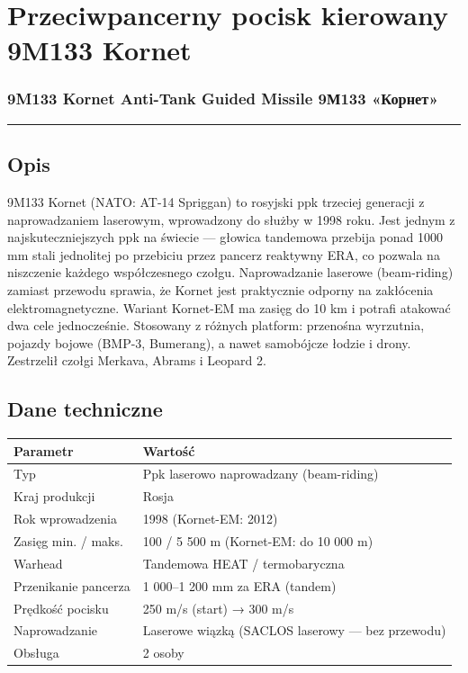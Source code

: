 \documentclass[12pt,oneside]{book}
\begin{document}
\section{Przeciwpancerny pocisk kierowany 9M133
Kornet}\label{przeciwpancerny-pocisk-kierowany-9m133-kornet}

\subsubsection{9M133 Kornet Anti-Tank Guided Missile \textbar{} 9М133
«Корнет»}\label{m133-kornet-anti-tank-guided-missile-9ux43c133-ux43aux43eux440ux43dux435ux442}

\begin{center}\rule{0.5\linewidth}{0.5pt}\end{center}

\subsection{Opis}\label{opis-53}

9M133 Kornet (NATO: AT-14 Spriggan) to rosyjski ppk trzeciej generacji z
naprowadzaniem laserowym, wprowadzony do służby w 1998 roku. Jest jednym
z najskuteczniejszych ppk na świecie --- głowica tandemowa przebija
ponad 1000 mm stali jednolitej po przebiciu przez pancerz reaktywny ERA,
co pozwala na niszczenie każdego współczesnego czołgu. Naprowadzanie
laserowe (beam-riding) zamiast przewodu sprawia, że Kornet jest
praktycznie odporny na zakłócenia elektromagnetyczne. Wariant Kornet-EM
ma zasięg do 10 km i potrafi atakować dwa cele jednocześnie. Stosowany z
różnych platform: przenośna wyrzutnia, pojazdy bojowe (BMP-3, Bumerang),
a nawet samobójcze łodzie i drony. Zestrzelił czołgi Merkava, Abrams i
Leopard 2.

\subsection{Dane techniczne}\label{dane-techniczne-53}

\begin{longtable}[]{@{}ll@{}}
\toprule\noalign{}
Parametr & Wartość \\
\midrule\noalign{}
\endhead
\bottomrule\noalign{}
\endlastfoot
Typ & Ppk laserowo naprowadzany (beam-riding) \\
Kraj produkcji & Rosja \\
Rok wprowadzenia & 1998 (Kornet-EM: 2012) \\
Zasięg min. / maks. & 100 / 5 500 m (Kornet-EM: do 10 000 m) \\
Warhead & Tandemowa HEAT / termobaryczna \\
Przenikanie pancerza & 1 000--1 200 mm za ERA (tandem) \\
Prędkość pocisku & 250 m/s (start) → 300 m/s \\
Naprowadzanie & Laserowe wiązką (SACLOS laserowy --- bez przewodu) \\
Obsługa & 2 osoby \\
\end{longtable}
\end{document}
